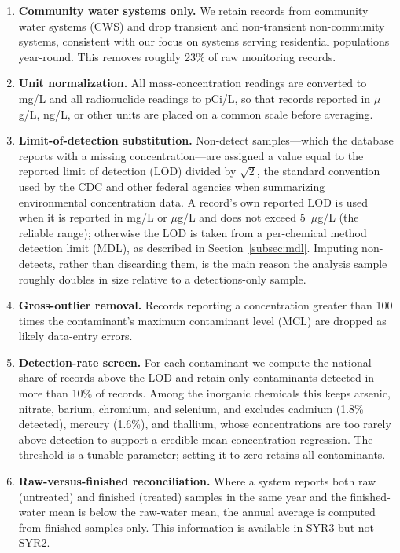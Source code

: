 \begin{enumerate}

  \item \textbf{Community water systems only.} We retain records from community
    water systems (CWS) and drop transient and non-transient non-community
    systems, consistent with our focus on systems serving residential
    populations year-round. This removes roughly 23\% of raw monitoring records.

  \item \textbf{Unit normalization.} All mass-concentration readings are
    converted to mg/L and all radionuclide readings to pCi/L, so that records
    reported in $\mu$g/L, ng/L, or other units are placed on a common scale
    before averaging.

  \item \textbf{Limit-of-detection substitution.} Non-detect samples---which the
    database reports with a missing concentration---are assigned a value equal
    to the reported limit of detection (LOD) divided by $\sqrt{2}$, the standard
    convention used by the CDC and other federal agencies when summarizing
    environmental concentration data. A record's own reported LOD is used when it
    is reported in mg/L or $\mu$g/L and does not exceed 5~$\mu$g/L (the reliable
    range); otherwise the LOD is taken from a per-chemical method detection limit
    (MDL), as described in Section~\ref{subsec:mdl}. Imputing non-detects, rather
    than discarding them, is the main reason the analysis sample roughly doubles
    in size relative to a detections-only sample.

  \item \textbf{Gross-outlier removal.} Records reporting a concentration greater
    than 100 times the contaminant's maximum contaminant level (MCL) are dropped
    as likely data-entry errors.

  \item \textbf{Detection-rate screen.} For each contaminant we compute the
    national share of records above the LOD and retain only contaminants
    detected in more than 10\% of records. Among the inorganic chemicals this
    keeps arsenic, nitrate, barium, chromium, and selenium, and excludes cadmium
    (1.8\% detected), mercury (1.6\%), and thallium, whose concentrations are too
    rarely above detection to support a credible mean-concentration regression.
    The threshold is a tunable parameter; setting it to zero retains all
    contaminants.

  \item \textbf{Raw-versus-finished reconciliation.} Where a system reports both
    raw (untreated) and finished (treated) samples in the same year and the
    finished-water mean is below the raw-water mean, the annual average is
    computed from finished samples only. This information is available in SYR3
    but not SYR2.

\end{enumerate}


